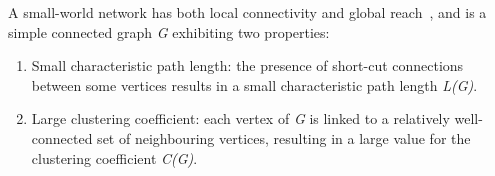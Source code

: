 \documentclass[conference]{IEEEtran}
\theoremstyle{definition}
\begin{document}
\begin{table}[htb]
\caption{Network measures for Gangs A, B, C, D. CC is the  average clustering coefficient from~\cite{WattsStrogatz1998}, considering only 1-neighbourhood.}
\label{tab:networkmeasuresgang}
\end{table}

A small-world network has both local connectivity and global
reach~\cite{WattsStrogatz1998}, and is a simple connected graph
\emph{G} exhibiting two properties:

\begin{enumerate}
\item Small characteristic path length: the presence of short-cut
connections between some vertices results in a small characteristic
path length \emph{L(G)}.
\item Large clustering coefficient: each vertex of \emph{G} is linked
to a relatively well-connected set of neighbouring vertices, resulting
in a large value for the clustering coefficient \emph{C(G)}.
\end{enumerate}
 
\end{document}
